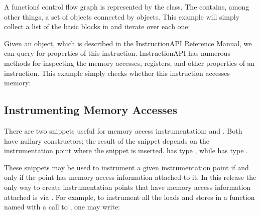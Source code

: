 
A function\'s control flow graph is represented by the  class. The
 contains, among other things, a set of  objects
connected by  objects. This example will simply collect a list of the basic blocks
in  and iterate over each one:


Given an  object, which is described in the InstructionAPI Reference Manual, we can
query for properties of this instruction. InstructionAPI has numerous methods for inspecting the
memory accesses, registers, and other properties of an instruction. This example simply checks whether
this instruction accesses memory:


\subsection{Instrumenting Memory Accesses}

There are two snippets useful for memory access instrumentation:  and
. Both have nullary constructors; the result of the snippet depends on the
instrumentation point where the snippet is inserted.  has type
, while  has type .

These snippets may be used to instrument a given instrumentation point if and only if the point has memory access
information attached to it. In this release the only way to create instrumentation points that have memory access
information attached is via . For
example, to instrument all the loads and stores in a function named  with a call to
, one may write:

